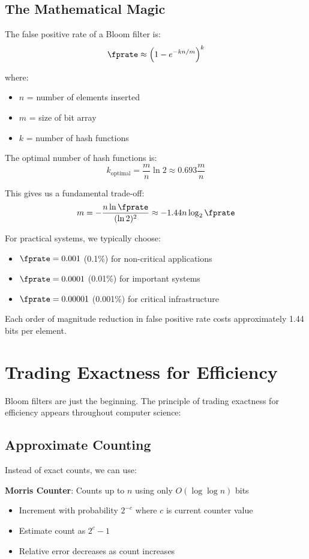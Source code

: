 \subsection{The Mathematical Magic}

The false positive rate of a Bloom filter is:
\[
\fprate \approx \left(1 - e^{-kn/m}\right)^k
\]

where:
\begin{itemize}
    \item $n$ = number of elements inserted
    \item $m$ = size of bit array
    \item $k$ = number of hash functions
\end{itemize}

The optimal number of hash functions is:
\[
k_{\text{optimal}} = \frac{m}{n} \ln 2 \approx 0.693 \frac{m}{n}
\]

This gives us a fundamental trade-off:
\[
m = -\frac{n \ln \fprate}{(\ln 2)^2} \approx -1.44 n \log_2 \fprate
\]

\begin{inpractice}
For practical systems, we typically choose:
\begin{itemize}
    \item $\fprate = 0.001$ (0.1\%) for non-critical applications
    \item $\fprate = 0.0001$ (0.01\%) for important systems
    \item $\fprate = 0.00001$ (0.001\%) for critical infrastructure
\end{itemize}
Each order of magnitude reduction in false positive rate costs approximately 1.44 bits per element.
\end{inpractice}

\section{Trading Exactness for Efficiency}

Bloom filters are just the beginning. The principle of trading exactness for efficiency appears throughout computer science:

\subsection{Approximate Counting}

Instead of exact counts, we can use:

\textbf{Morris Counter}: Counts up to $n$ using only $O(\log \log n)$ bits
\begin{itemize}
    \item Increment with probability $2^{-c}$ where $c$ is current counter value
    \item Estimate count as $2^c - 1$
    \item Relative error decreases as count increases
\end{itemize}

